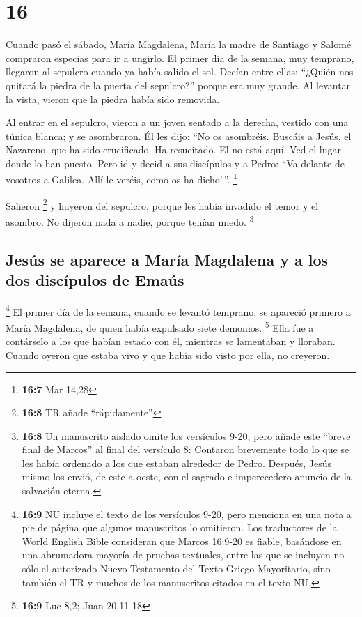 \hypertarget{section-15}{%
\section{16}\label{section-15}}

 Cuando pasó el sábado, María Magdalena, María la madre de
Santiago y Salomé compraron especias para ir a ungirlo. 
El primer día de la semana, muy temprano, llegaron al sepulcro cuando ya
había salido el sol.  Decían entre ellas: ``¿Quién nos
quitará la piedra de la puerta del sepulcro?''  porque era
muy grande. Al levantar la vista, vieron que la piedra había sido
removida.

 Al entrar en el sepulcro, vieron a un joven sentado a la
derecha, vestido con una túnica blanca; y se asombraron. 
Él les dijo: ``No os asombréis. Buscáis a Jesús, el Nazareno, que ha
sido crucificado. Ha resucitado. El no está aquí. Ved el lugar donde lo
han puesto.  Pero id y decid a sus discípulos y a Pedro:
``Va delante de vosotros a Galilea. Allí le veréis, como os ha
dicho'\,''. \footnote{\textbf{16:7} Mar 14,28}

 Salieron \footnote{\textbf{16:8} TR añade ``rápidamente''}
y huyeron del sepulcro, porque les había invadido el temor y el asombro.
No dijeron nada a nadie, porque tenían miedo. \footnote{\textbf{16:8} Un
  manuscrito aislado omite los versículos 9-20, pero añade este ``breve
  final de Marcos'' al final del versículo 8: Contaron brevemente todo
  lo que se les había ordenado a los que estaban alrededor de Pedro.
  Después, Jesús mismo los envió, de este a oeste, con el sagrado e
  imperecedero anuncio de la salvación eterna.}

\hypertarget{jesuxfas-se-aparece-a-maruxeda-magdalena-y-a-los-dos-discuxedpulos-de-emauxfas}{%
\subsection{Jesús se aparece a María Magdalena y a los dos discípulos de
Emaús}\label{jesuxfas-se-aparece-a-maruxeda-magdalena-y-a-los-dos-discuxedpulos-de-emauxfas}}

 \footnote{\textbf{16:9} NU incluye el texto de los
  versículos 9-20, pero menciona en una nota a pie de página que algunos
  manuscritos lo omitieron. Los traductores de la World English Bible
  consideran que Marcos 16:9-20 es fiable, basándose en una abrumadora
  mayoría de pruebas textuales, entre las que se incluyen no sólo el
  autorizado Nuevo Testamento del Texto Griego Mayoritario, sino también
  el TR y muchos de los manuscritos citados en el texto NU.} El primer
día de la semana, cuando se levantó temprano, se apareció primero a
María Magdalena, de quien había expulsado siete demonios. \footnote{\textbf{16:9}
  Luc 8,2; Juan 20,11-18}  Ella fue a contárselo a los
que habían estado con él, mientras se lamentaban y lloraban.
 Cuando oyeron que estaba vivo y que había sido visto por
ella, no creyeron.

